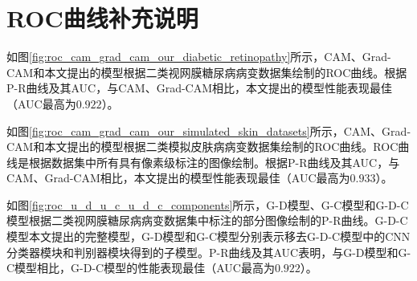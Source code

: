 \chapter{ROC曲线补充说明}\label{chapter:append1}
如图\ref{fig:roc_cam_grad_cam_our_diabetic_retinopathy}所示，CAM、Grad-CAM和本文提出的模型根据二类视网膜糖尿病病变数据集绘制的ROC曲线。根据P-R曲线及其AUC，与CAM、Grad-CAM相比，本文提出的模型性能表现最佳（AUC最高为$0.922$）。

如图\ref{fig:roc_cam_grad_cam_our_simulated_skin_datasets}所示，CAM、Grad-CAM和本文提出的模型根据二类模拟皮肤病病变数据集绘制的ROC曲线。ROC曲线是根据数据集中所有具有像素级标注的图像绘制。根据P-R曲线及其AUC，与CAM、Grad-CAM相比，本文提出的模型性能表现最佳（AUC最高为$0.933$）。

如图\ref{fig:roc_u_d_u_c_u_d_c_components}所示，G-D模型、G-C模型和G-D-C模型根据二类视网膜糖尿病病变数据集中标注的部分图像绘制的P-R曲线。G-D-C模型本文提出的完整模型，G-D模型和G-C模型分别表示移去G-D-C模型中的CNN分类器模块和判别器模块得到的子模型。P-R曲线及其AUC表明，与G-D模型和G-C模型相比，G-D-C模型的性能表现最佳（AUC最高为$0.922$）。
